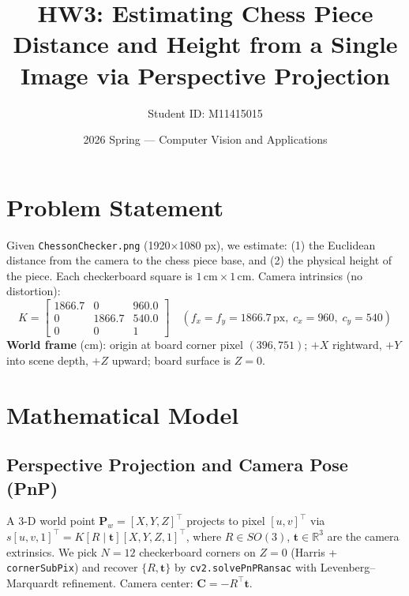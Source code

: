 \documentclass[11pt,a4paper]{article}
\title{\textbf{HW3: Estimating Chess Piece Distance and Height
       from a Single Image via Perspective Projection}}
\author{Student ID: M11415015}
\date{2026 Spring --- Computer Vision and Applications}
\begin{document}
\maketitle
\vspace{-1em}

\section{Problem Statement}

Given \texttt{ChessonChecker.png} (1920$\times$1080 px), we estimate: (1) the Euclidean distance from the camera to the chess piece base, and (2) the physical height of the piece. Each checkerboard square is $1\,\text{cm}\times1\,\text{cm}$. Camera intrinsics (no distortion):
\[
  K = \begin{bmatrix}1866.7 & 0 & 960.0 \\ 0 & 1866.7 & 540.0 \\ 0 & 0 & 1\end{bmatrix}
  \quad (f_x=f_y=1866.7\,\text{px},\;c_x=960,\;c_y=540)
\]
\textbf{World frame} (cm): origin at board corner pixel $(396,751)$; $+X$ rightward, $+Y$ into scene depth, $+Z$ upward; board surface is $Z=0$.

\section{Mathematical Model}

\subsection{Perspective Projection and Camera Pose (PnP)}

A 3-D world point $\mathbf{P}_w=[X,Y,Z]^\top$ projects to pixel $[u,v]^\top$ via
$s[u,v,1]^\top = K[R\mid\mathbf{t}][X,Y,Z,1]^\top$,
where $R\in SO(3)$, $\mathbf{t}\in\mathbb{R}^3$ are the camera extrinsics. We pick $N=12$ checkerboard corners on $Z=0$ (Harris + \texttt{cornerSubPix}) and recover $\{R,\mathbf{t}\}$ by \texttt{cv2.solvePnPRansac} with Levenberg--Marquardt refinement. Camera center: $\mathbf{C}=-R^\top\mathbf{t}$.
\end{document}
